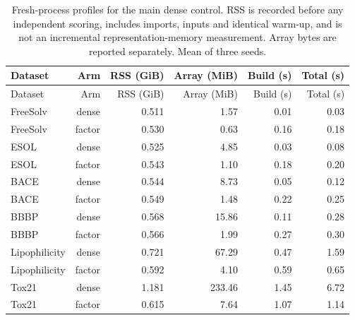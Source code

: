 \begin{longtable}{lrrrrr}
\caption{Fresh-process profiles for the main dense control. RSS is recorded before any independent scoring, includes imports, inputs and identical warm-up, and is not an incremental representation-memory measurement. Array bytes are reported separately. Mean of three seeds.}\\
\toprule
Dataset & Arm & RSS (GiB) & Array (MiB) & Build (s) & Total (s)\\\midrule
\endfirsthead
\toprule
Dataset & Arm & RSS (GiB) & Array (MiB) & Build (s) & Total (s)\\\midrule
\endhead
\midrule\endfoot
\bottomrule\endlastfoot
FreeSolv & dense & 0.511 & 1.57 & 0.01 & 0.03\\
FreeSolv & factor & 0.530 & 0.63 & 0.16 & 0.18\\
ESOL & dense & 0.525 & 4.85 & 0.03 & 0.08\\
ESOL & factor & 0.543 & 1.10 & 0.18 & 0.20\\
BACE & dense & 0.544 & 8.73 & 0.05 & 0.12\\
BACE & factor & 0.549 & 1.48 & 0.22 & 0.25\\
BBBP & dense & 0.568 & 15.86 & 0.11 & 0.28\\
BBBP & factor & 0.566 & 1.99 & 0.27 & 0.30\\
Lipophilicity & dense & 0.721 & 67.29 & 0.47 & 1.59\\
Lipophilicity & factor & 0.592 & 4.10 & 0.59 & 0.65\\
Tox21 & dense & 1.181 & 233.46 & 1.45 & 6.72\\
Tox21 & factor & 0.615 & 7.64 & 1.07 & 1.14\\
\end{longtable}
